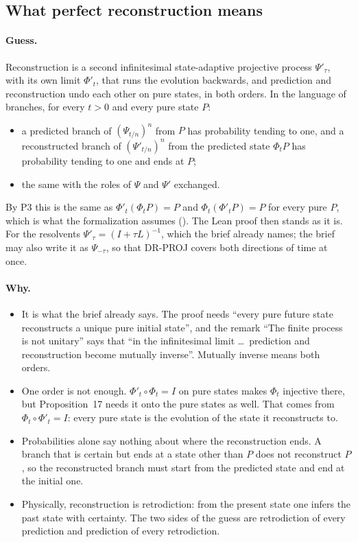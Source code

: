 \documentclass[11pt]{article}
\begin{document}
\subsection{What perfect reconstruction means}

\paragraph{Guess.} Reconstruction is a second infinitesimal state-adaptive projective process
$\Psi'_\tau$, with its own limit $\Phi'_t$, that runs the evolution backwards, and prediction and
reconstruction undo each other on pure states, in both orders. In the language of branches, for
every $t > 0$ and every pure state $P$:
\begin{itemize}
\item a predicted branch of $(\Psi_{t/n})^n$ from $P$ has probability tending to one, and a
  reconstructed branch of $(\Psi'_{t/n})^n$ from the predicted state $\Phi_tP$ has probability
  tending to one and ends at $P$;
\item the same with the roles of $\Psi$ and $\Psi'$ exchanged.
\end{itemize}
By P3 this is the same as $\Phi'_t(\Phi_tP) = P$ and $\Phi_t(\Phi'_tP) = P$ for every pure $P$,
which is what the formalization assumes (). The Lean proof then stands as it is. For
the resolvents $\Psi'_\tau = (I + \tau L)^{-1}$, which the brief already names; the brief may also
write it as $\Psi_{-\tau}$, so that DR-PROJ covers both directions of time at once.

\paragraph{Why.}
\begin{itemize}
\item It is what the brief already says. The proof needs ``every pure future state reconstructs a
  unique pure initial state'', and the remark ``The finite process is not unitary'' says that
  ``in the infinitesimal limit \ldots\ prediction and reconstruction become mutually inverse''.
  Mutually inverse means both orders.
\item One order is not enough. $\Phi'_t\circ\Phi_t = I$ on pure states makes $\Phi_t$ injective
  there, but Proposition~17 needs it onto the pure states as well. That comes from
  $\Phi_t\circ\Phi'_t = I$: every pure state is the evolution of the state it reconstructs to.
\item Probabilities alone say nothing about where the reconstruction ends. A branch that is
  certain but ends at a state other than $P$ does not reconstruct $P$, so the reconstructed
  branch must start from the predicted state and end at the initial one.
\item Physically, reconstruction is retrodiction: from the present state one infers the past
  state with certainty. The two sides of the guess are retrodiction of every prediction and
  prediction of every retrodiction.
\end{itemize}
\end{document}
